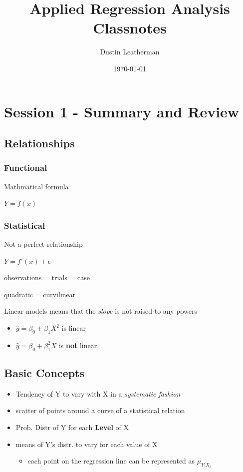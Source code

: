 \documentclass[11pt]{article}
\author{Dustin Leatherman}
\date{\today}
\title{Applied Regression Analysis Classnotes}
\begin{document}
\maketitle
\tableofcontents


\section{Session 1 - Summary and Review}
\label{sec:org3ad0cb4}
\subsection{Relationships}
\label{sec:org9c3eab5}
\subsubsection{Functional}
\label{sec:org0178a89}
Mathmatical formula

\(Y = f(x)\)
\subsubsection{Statistical}
\label{sec:org1bd0f84}
Not a perfect relationship

\(Y = f'(x) + \epsilon\)

observations = trials = case

quadratic = curvilinear

Linear models means that the \emph{slope} is not raised to any powers
\begin{itemize}
\item \(\hat{y} = \beta_0 + \beta_1 X^2\) is linear
\item \(\hat{y} = \beta_0 + \beta_1^2 X\) is \textbf{not} linear
\end{itemize}

\subsection{Basic Concepts}
\label{sec:orgf482a19}
\begin{itemize}
\item Tendency of Y to vary with X in a \emph{systematic fashion}
\item scatter of points around a curve of a statistical relation
\item Prob. Distr of Y for each \textbf{Level} of X
\item means of Y's distr. to vary for each value of X
\begin{itemize}
\item each point on the regression line can be represented as \(\mu_{Y|X_i}\)
\end{itemize}
\end{itemize}
\end{document}
